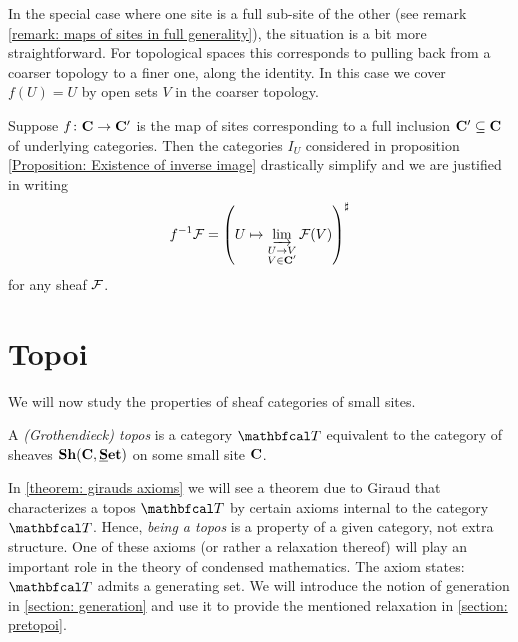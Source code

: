 In the special case where one site is a full sub-site of the other (see remark \ref{remark: maps of sites in full generality}), the situation is a bit more straightforward. For topological spaces this corresponds to pulling back from a coarser topology to a finer one, along the identity. In this case we cover $f(U)=U$ by open sets $V$ in the coarser topology.
\begin{remark}
	\label{remark: inverse images for inclusions}
	Suppose $f\colon{{\mathbf{C}}} \to {{\mathbf{C}}}'$ is the map of sites corresponding to a full inclusion ${{\mathbf{C}}}'\subseteq {{\mathbf{C}}}$ of underlying categories. Then the categories $I_U$ considered in proposition \ref{Proposition: Existence of inverse image} drastically simplify and we are justified in writing
		$$f^{-1}\sheaf F = \sheafification{U\mapsto \colimit_{\substack{U\to V\\V\in \site C'}} \sheaf F(V)}$$
	for any sheaf ${\mathcal{F}}$.
\end{remark}


\section{Topoi}
\label{section: topoi}

We will now study the properties of sheaf categories of small sites.
\begin{definition}
	A \emph{(Grothendieck) topos} is a category $\category T$ equivalent to the category of sheaves $\Sheaves{\site C}{\Set}$ on some small site ${{\mathbf{C}}}$.
\end{definition}

\begin{remark}
	\label{remark: giraud's theorem}
	
	In \ref{theorem: girauds axioms} we will see a theorem due to Giraud that characterizes a topos $\category T$ by certain axioms internal to the category $\category T$. Hence, \emph{being a topos} is a property of a given category, not extra structure. One of these axioms (or rather a relaxation thereof) will play an important role in the theory of condensed mathematics. The axiom states: $\category T$ admits a generating set. We will introduce the notion of generation in \ref{section: generation} and use it to provide the mentioned relaxation in \ref{section: pretopoi}.
\end{remark}

